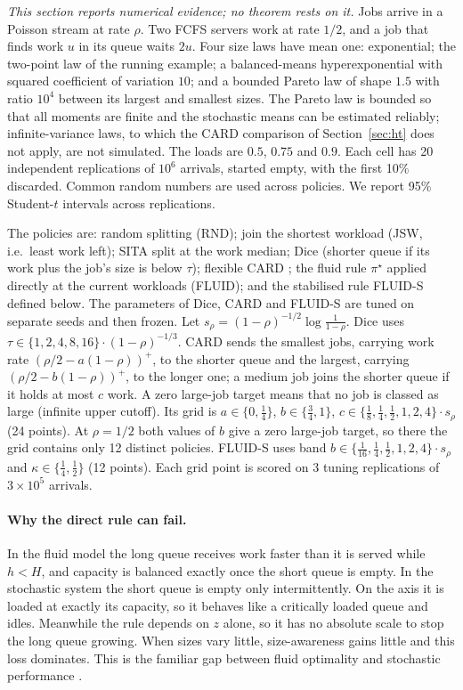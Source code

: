 \documentclass[11pt]{article}
\numberwithin{equation}{section}
\theoremstyle{definition}
\theoremstyle{remark}
\begin{document}
\emph{This section reports numerical evidence; no theorem rests on it.} Jobs arrive in a Poisson stream at rate $\rho$. Two FCFS servers work at rate $1/2$, and a job that finds work $u$ in its queue waits $2u$. Four size laws have mean one: exponential; the two-point law of the running example; a balanced-means hyperexponential with squared coefficient of variation $10$; and a bounded Pareto law of shape $1.5$ with ratio $10^4$ between its largest and smallest sizes. The Pareto law is bounded so that all moments are finite and the stochastic means can be estimated reliably; infinite-variance laws, to which the CARD comparison of Section~\ref{sec:ht} does not apply, are not simulated. The loads are $0.5$, $0.75$ and $0.9$. Each cell has 20 independent replications of $10^6$ arrivals, started empty, with the first 10\% discarded. Common random numbers are used across policies. We report 95\% Student-$t$ intervals across replications.

The policies are: random splitting (RND); join the shortest workload (JSW, i.e.\ least work left); SITA split at the work median; Dice \cite{HR2022} (shorter queue if its work plus the job's size is below $\tau$); flexible CARD \cite{XGS2024}; the fluid rule $\pi^\star$ applied directly at the current workloads (FLUID); and the stabilised rule FLUID-S defined below. The parameters of Dice, CARD and FLUID-S are tuned on separate seeds and then frozen. Let $s_\rho=(1-\rho)^{-1/2}\log\frac1{1-\rho}$. Dice uses $\tau\in\{1,2,4,8,16\}\cdot(1-\rho)^{-1/3}$. CARD sends the smallest jobs, carrying work rate $(\rho/2-a(1-\rho))^+$, to the shorter queue and the largest, carrying $(\rho/2-b(1-\rho))^+$, to the longer one; a medium job joins the shorter queue if it holds at most $c$ work. A zero large-job target means that no job is classed as large (infinite upper cutoff). Its grid is $a\in\{0,\frac14\}$, $b\in\{\frac34,1\}$, $c\in\{\frac18,\frac14,\frac12,1,2,4\}\cdot s_\rho$ (24 points). At $\rho=1/2$ both values of $b$ give a zero large-job target, so there the grid contains only 12 distinct policies. FLUID-S uses band $b\in\{\frac1{16},\frac14,\frac12,1,2,4\}\cdot s_\rho$ and $\kappa\in\{\frac14,\frac12\}$ (12 points). Each grid point is scored on 3 tuning replications of $3\times10^5$ arrivals.

\paragraph{Why the direct rule can fail.} In the fluid model the long queue receives work faster than it is served while $h<H$, and capacity is balanced exactly once the short queue is empty. In the stochastic system the short queue is empty only intermittently. On the axis it is loaded at exactly its capacity, so it behaves like a critically loaded queue and idles. Meanwhile the rule depends on $z$ alone, so it has no absolute scale to stop the long queue growing. When sizes vary little, size-awareness gains little and this loss dominates. This is the familiar gap between fluid optimality and stochastic performance \cite{Meyn2008,Maglaras2000,Bauerle2000}.
\end{document}
